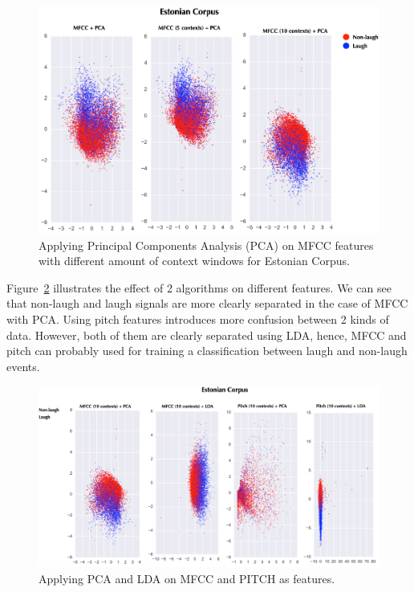 \documentclass[10pt,journal,compsoc]{IEEEtran}
\begin{document}
\begin{figure}[!t]
\centering
\includegraphics[width=1\linewidth]{images/PCA-MFCC-EE.png}
\caption{Applying Principal Components Analysis (PCA) on MFCC features with different amount of context windows for Estonian Corpus.}
\label{fig:EE-pca-mfcc}
\end{figure}


Figure~\ref{fig:applying-pca-and-lda} illustrates the effect of 2 algorithms on different features. We can see that non-laugh and laugh signals are more clearly separated in the case of MFCC with PCA. Using pitch features introduces more confusion between 2 kinds of data. However, both of them are clearly separated using LDA, hence, MFCC and pitch can probably used for training a classification between laugh and non-laugh events.

\begin{figure}[!t]
\centering
\includegraphics[width=1\linewidth]{images/ApplyingPCAandLDA-2.png}
\caption{Applying PCA and LDA on MFCC and PITCH as features.}
\label{fig:applying-pca-and-lda}
\end{figure}
\end{document}
